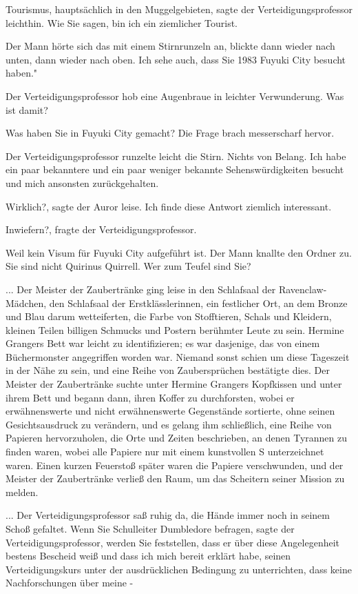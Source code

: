 \glqq Tourismus, hauptsächlich in den Muggelgebieten\grqq{}, sagte der
Verteidigungsprofessor leichthin. \glqq Wie Sie sagen, bin ich ein ziemlicher
Tourist.\grqq{}

Der Mann hörte sich das mit einem Stirnrunzeln an, blickte dann wieder nach
unten, dann wieder nach oben. \glqq Ich sehe auch, dass Sie 1983 Fuyuki City
besucht haben."

Der Verteidigungsprofessor hob eine Augenbraue in leichter Verwunderung. \glqq
Was ist damit?\grqq{}

\glqq Was haben Sie in Fuyuki City gemacht?\grqq{} Die Frage brach messerscharf
hervor.

Der Verteidigungsprofessor runzelte leicht die Stirn. \glqq Nichts von Belang.
Ich habe ein paar bekanntere und ein paar weniger bekannte Sehenswürdigkeiten
besucht und mich ansonsten zurückgehalten.\grqq{}

\glqq Wirklich?\grqq{}, sagte der Auror leise. \glqq Ich finde diese Antwort
ziemlich interessant.\grqq{}

\glqq Inwiefern?\grqq{}, fragte der Verteidigungsprofessor.

\glqq Weil kein Visum für Fuyuki City aufgeführt ist.\grqq{} Der Mann knallte
den Ordner zu. \glqq Sie sind nicht Quirinus Quirrell. Wer zum Teufel sind
Sie?\grqq{}


... Der Meister der Zaubertränke ging leise in den Schlafsaal der
Ravenclaw-Mädchen, den Schlafsaal der Erstklässlerinnen, ein festlicher Ort, an
dem Bronze und Blau darum wetteiferten, die Farbe von Stofftieren, Schals und
Kleidern, kleinen Teilen billigen Schmucks und Postern berühmter Leute zu sein.
Hermine Grangers Bett war leicht zu identifizieren; es war dasjenige, das von
einem Büchermonster angegriffen worden war. Niemand sonst schien um diese
Tageszeit in der Nähe zu sein, und eine Reihe von Zaubersprüchen bestätigte
dies. Der Meister der Zaubertränke suchte unter Hermine Grangers Kopfkissen und
unter ihrem Bett und begann dann, ihren Koffer zu durchforsten, wobei er
erwähnenswerte und nicht erwähnenswerte Gegenstände sortierte, ohne seinen
Gesichtsausdruck zu verändern, und es gelang ihm schließlich, eine Reihe von
Papieren hervorzuholen, die Orte und Zeiten beschrieben, an denen Tyrannen zu
finden waren, wobei alle Papiere nur mit einem kunstvollen \glqq S\grqq{}
unterzeichnet waren. Einen kurzen Feuerstoß später waren die Papiere
verschwunden, und der Meister der Zaubertränke verließ den Raum, um das
Scheitern seiner Mission zu melden.


... Der Verteidigungsprofessor saß ruhig da, die Hände immer noch in seinem
Schoß gefaltet. \glqq Wenn Sie Schulleiter Dumbledore befragen\grqq{}, sagte der
Verteidigungsprofessor, \glqq werden Sie feststellen, dass er über diese
Angelegenheit bestens Bescheid weiß und dass ich mich bereit erklärt habe,
seinen Verteidigungskurs unter der ausdrücklichen Bedingung zu unterrichten,
dass keine Nachforschungen über meine -\grqq{}

